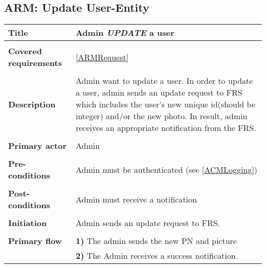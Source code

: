 \documentclass[a4paper,11pt]{article}
\begin{document}
\subsection{ARM: Update User-Entity}

\begin{tabular}{|p{3.5cm}|p{11.5cm}|} \hline
    \textbf{Title} &   Admin \emph{UPDATE} a user

    \\ \hline \rowcolor{Gray} & \\ \hline

    \textbf{Covered requirements} &  \ref{ARMRequest}

    \\ \hline \rowcolor{Gray} & \\ \hline

    \textbf{Description} &  Admin want to update a user. In order to update a user, admin sends an update request to FRS which includes the user's new unique id(should be integer) and/or the new photo. In result, admin receives an appropriate notification from the FRS.

    \\ \hline \rowcolor{Gray} & \\ \hline

    \textbf{Primary actor} & Admin

    \\ \hline \rowcolor{Gray} & \\ \hline

    \textbf{Pre-conditions} &   Admin must be authenticated (see \ref{ACMLogging})

    \\ \hline \rowcolor{Gray} & \\ \hline

    \textbf{Post-conditions} &   Admin must receive a notification

    \\ \hline \rowcolor{Gray} & \\ \hline

    \textbf{Initiation} & Admin sends an update request to FRS.

    \\ \hline \rowcolor{Gray} & \\ \hline

    \textbf{Primary flow} &
    \textbf{1)} The admin sends the new PN and picture \\&
    \textbf{2)} The Admin receives a success notification.


\end{tabular}
\end{document}
